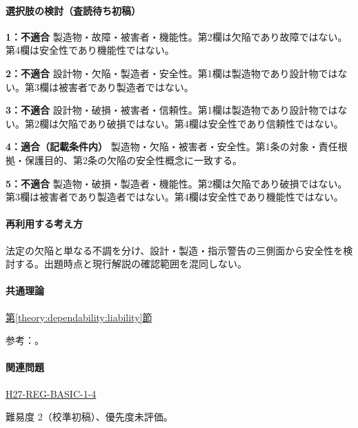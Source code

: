 \paragraph{選択肢の検討（査読待ち初稿）}\mbox{}\par

\noindent\textbf{1：不適合} 製造物・故障・被害者・機能性。第2欄は欠陥であり故障ではない。第4欄は安全性であり機能性ではない。\par

\noindent\textbf{2：不適合} 設計物・欠陥・製造者・安全性。第1欄は製造物であり設計物ではない。第3欄は被害者であり製造者ではない。\par

\noindent\textbf{3：不適合} 設計物・破損・被害者・信頼性。第1欄は製造物であり設計物ではない。第2欄は欠陥であり破損ではない。第4欄は安全性であり信頼性ではない。\par

\noindent\textbf{4：適合（記載条件内）} 製造物・欠陥・被害者・安全性。第1条の対象・責任根拠・保護目的、第2条の欠陥の安全性概念に一致する。\par

\noindent\textbf{5：不適合} 製造物・破損・製造者・機能性。第2欄は欠陥であり破損ではない。第3欄は被害者であり製造者ではない。第4欄は安全性であり機能性ではない。\par

\paragraph{再利用する考え方} 法定の欠陥と単なる不調を分け、設計・製造・指示警告の三側面から安全性を検討する。出題時点と現行解説の確認範囲を混同しない。

\paragraph{共通理論} \hyperref[theory:dependability:liability]{第\ref*{theory:dependability:liability}節}

\par 参考：\cite{design_caa_pl1,design_caa_pl2}。

\paragraph{関連問題} \hyperref[q:h27-reg-basic-1-4]{H27-REG-BASIC-1-4}

\par 難易度 2（校準初稿）、優先度未評価。

